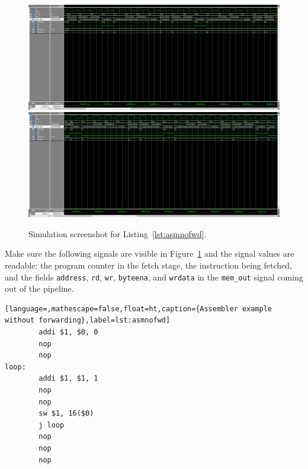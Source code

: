 \documentclass[11pt,a4paper,titlepage,oneside]{article}
\begin{document}
\maketitle


\begin{figure}[ht!]
  \centering
  \framebox[\linewidth]{
  }
  \includegraphics[width=1.0\linewidth]{p1.png}
  \includegraphics[width=1.0\linewidth]{p2.png}
  \caption{Simulation screenshot for Listing~\ref{lst:asmnofwd}.}
  \label{fig:sim}
\end{figure}

Make sure the following signals are visible in Figure~\ref{fig:sim} and the signal values are readable:
the program counter in the fetch stage, the instruction being fetched,
and the fields \texttt{address}, \texttt{rd}, \texttt{wr},
\texttt{byteena}, and \texttt{wrdata} in the \texttt{mem\_out} signal
coming out of the pipeline.

\begin{lstlisting}[language=,mathescape=false,float=ht,caption={Assembler example without forwarding},label=lst:asmnofwd]
        addi $1, $0, 0
        nop
        nop
loop:
        addi $1, $1, 1
        nop
        nop
        sw $1, 16($0)
        j loop
        nop
        nop
        nop
\end{lstlisting}
\end{document}
